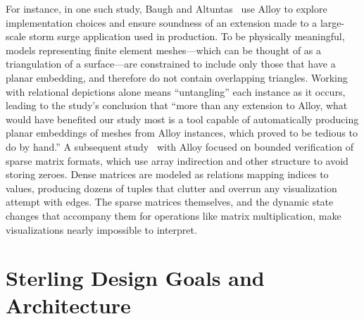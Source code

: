 \documentclass[runningheads]{llncs}
\begin{document}
For instance, in one such study, Baugh and Altuntas~\cite{baugh-scp-2018} use Alloy to explore implementation choices and ensure soundness of an extension made to a large-scale storm surge application used in production.
To be physically meaningful, models representing finite element meshes---which can be thought of as a triangulation of a surface---are constrained to include only those that have a planar embedding, and therefore do not contain overlapping triangles.
Working with relational depictions alone means ``untangling'' each instance as it occurs, leading to the study's conclusion that ``more than any extension to Alloy, what would have benefited our study most is a tool capable of automatically producing planar embeddings of meshes from Alloy instances, which proved to be tedious to do by hand.''
A subsequent study~\cite{dyer2019} with Alloy focused on bounded verification of sparse matrix formats, which use array indirection and other structure to avoid storing zeroes.
Dense matrices are modeled as relations mapping indices to values, producing dozens of tuples that clutter and overrun any visualization attempt with edges.
The sparse matrices themselves, and the dynamic state changes that accompany them for operations like matrix multiplication, make visualizations nearly impossible to interpret.


\section{Sterling Design Goals and Architecture}
\label{sterling}

\end{document}
